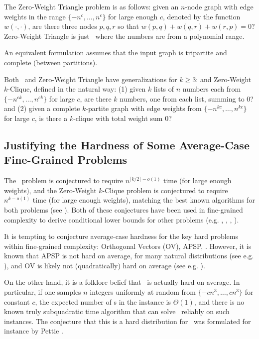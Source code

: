 The Zero-Weight Triangle problem is as follows: given an $n$-node graph with edge weights in the range $\{-n^c,\ldots,n^c\}$ for large enough $c$, denoted by the function $w(\cdot, \cdot)$, are there three nodes $p,q,r$ so that $w(p,q)+w(q,r)+w(r,p)=0$? Zero-Weight Triangle is just \zThclique~where the numbers are from a polynomial range.

An equivalent formulation assumes that the input graph is tripartite and complete (between partitions).

Both \ThSum~and Zero-Weight Triangle have generalizations for $k\geq 3$: \kSum and Zero-Weight $k$-Clique, defined in the natural way: (1) given $k$ lists of $n$ numbers each from $\{-n^{ck},\ldots,n^{ck}\}$ for large $c$, are there $k$ numbers, one from each list, summing to $0$? and (2) given a complete $k$-partite graph with edge weights from $\{-n^{kc},\ldots,n^{kc}\}$ for large $c$, is there a $k$-clique with total weight sum $0$?

\subsection{Justifying the Hardness of Some Average-Case Fine-Grained Problems}
The \kSum~problem is conjectured to require $n^{\lceil k/2\rceil-o(1)}$ time (for large enough weights), and the Zero-Weight $k$-Clique problem is conjectured to require $n^{k-o(1)}$ time (for large enough weights), matching the best known algorithms for both problems (see \cite{icm-survey}). Both of these conjectures have been used in fine-grained complexity to derive conditional lower bounds for other problems (e.g. \cite{BackursT16},  \cite{abboud2014consequences}, \cite{sparseGraphsLVWW}, \cite{treeEditDistance}).

It is tempting to conjecture average-case hardness for the key hard problems within fine-grained complexity: Orthogonal Vectors (OV), APSP, \ThSum. However, it is known that APSP is not hard on average, for many natural distributions (see e.g. \cite{PeresSSZ13,averageAPSP}), and OV is likely not (quadratically) hard on average (see e.g. \cite{KW17}).

On the other hand, it is a folklore belief that \ThSum~is actually hard on average.
In particular, if one samples $n$ integers uniformly at random from $\{-cn^3,\ldots,cn^3\}$ for constant $c$, the expected number of \ThSum s in the instance is $\Theta(1)$, and there is no known truly subquadratic time algorithm that can solve \ThSum~reliably on such instances. The conjecture that this is a hard distribution for \ThSum~was formulated for instance by Pettie \cite{avgCase3Sum}. 

